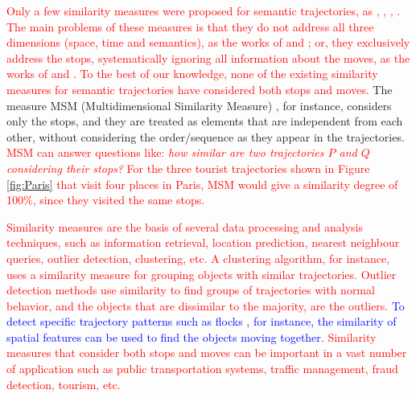 \documentclass[12pt]{article}
\begin{document}
\textcolor{red}{Only a few  similarity measures were proposed for semantic trajectories, as \cite{Kang:2009:SMT:1529282.1529580}, \cite{Liu:2012:SMM:2442968.2442971}, \cite{Ying:2010:MUS:1867699.1867703}, \cite{Furtado:TGIS12156}. The main problems of these measures is that they do not address all three dimensions (space, time and semantics), as the works of \cite{Kang:2009:SMT:1529282.1529580} and \cite{Liu:2012:SMM:2442968.2442971}; or, 
they exclusively address the stops, systematically ignoring all information about the moves, as the works of \cite{Ying:2010:MUS:1867699.1867703} and \cite{Furtado:TGIS12156}. To the best of our knowledge, none of the existing similarity measures for semantic trajectories have considered both stops and moves.} The measure MSM (Multidimensional Similarity Measure) \citep{Furtado:TGIS12156}, for instance, considers only the stops, and they are treated as elements that are independent from each other, without considering the order/sequence as they appear in the trajectories. \textcolor{red}{ MSM can answer questions like: \emph{how similar are two trajectories $P$ and $Q$ considering their stops?} For the three tourist trajectories shown in Figure \ref{fig:Paris} that visit four places in Paris, MSM would give a similarity degree of 100\%, since they visited the same stops.}

 

\textcolor{red}{Similarity measures are the basis of several data processing and analysis techniques, such as information retrieval, location prediction, nearest neighbour queries, outlier detection, clustering, etc. A clustering algorithm, for instance, uses a similarity measure for grouping objects with similar trajectories. Outlier detection methods use similarity to find groups of trajectories with normal behavior, and the objects that are dissimilar to the majority, are the outliers. \textcolor{blue}{To detect specific trajectory patterns such as flocks \citep{Laube2005}, for instance, the similarity of spatial features can be used to find the objects moving together}. Similarity measures that consider both stops and moves can be important in a vast number of application such as public transportation systems, traffic management, fraud detection, tourism, etc. }
\end{document}
